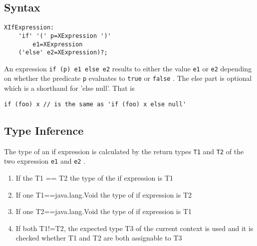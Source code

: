 \documentclass[a4paper,10pt]{scrreprt}
\newlength{\itemindentlen}
\begin{document}
\subsection{Syntax}

\begin{lstlisting}
XIfExpression:
	'if' '(' p=XExpression ')'
		e1=XExpression
	('else' e2=XExpression)?;

\end{lstlisting}


An expression \lstinline{if (p) e1 else e2}
 results to either the value \lstinline{e1}
 or \lstinline{e2}
 depending on whether the predicate \lstinline{p}
 evaluates to \lstinline{true}
 or \lstinline{false}
. 
The else part is optional which is a shorthand for 'else null'.
That is 
\begin{lstlisting}
if (foo) x // is the same as 'if (foo) x else null' 

\end{lstlisting}





\subsection{Type Inference}
\label{IfTypeInference}
The type of an if expression is calculated by the return types \lstinline{T1}
 and \lstinline{T2}
 of the two expression \lstinline{e1}
 and \lstinline{e2}
.

\setlength{\itemindentlen}{\textwidth}
\begin{enumerate}
\addtolength{\itemindentlen}{-2em}

\item \begin{minipage}[t]{\itemindentlen}
If the T1 == T2 the type of the if expression is T1
\end{minipage}

\item \begin{minipage}[t]{\itemindentlen}
If one T1==java.lang.Void the type of if expression is T2
\end{minipage}

\item \begin{minipage}[t]{\itemindentlen}
If one T2==java.lang.Void the type of if expression is T1
\end{minipage}

\item \begin{minipage}[t]{\itemindentlen}
If both T1!=T2, the expected type T3 of the current context is used and it is checked whether T1 and T2 are both assignable to T3
\end{minipage}

\end{enumerate}
\addtolength{\itemindentlen}{2em}
\end{document}
